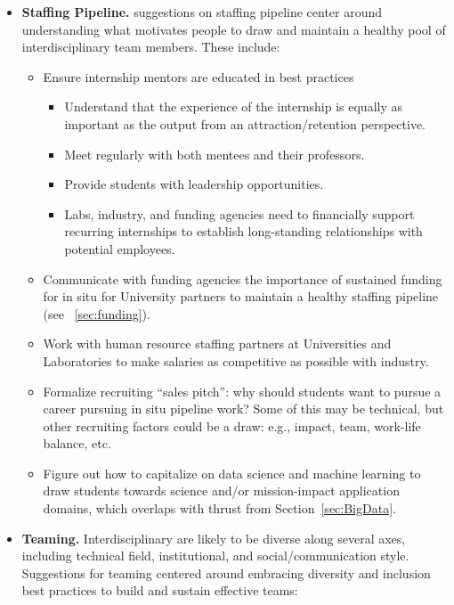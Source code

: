 \begin{itemize}
    \item \textbf{\sffamily Staffing Pipeline.} suggestions on staffing pipeline center around understanding what motivates people to draw and maintain a healthy pool of interdisciplinary team members.  These include:
    \begin{itemize}
        \item Ensure internship mentors are educated in best practices  
        \begin{itemize}
            \item Understand that the experience of the internship is equally as important as the output from an attraction/retention perspective.
            \item  Meet regularly with both mentees and their professors.
            \item  Provide students with leadership opportunities.
            \item  Labs, industry, and funding agencies need to financially support recurring internships to establish long-standing relationships with potential employees.
        \end{itemize}
        \item Communicate with funding agencies the importance of sustained funding for in situ for University partners to maintain a healthy staffing pipeline (see ~\ref{sec:funding}).
        \item Work with human resource staffing partners at Universities and Laboratories to make salaries as competitive as possible with industry.
        \item Formalize recruiting ``sales pitch'': why should students want to pursue a career pursuing in situ pipeline work? Some of this may be technical, but other recruiting factors could be a draw: e.g., impact, team, work-life balance, etc.
        \item Figure out how to capitalize on data science and machine learning to draw students towards science and/or mission-impact application domains, which overlaps with thrust from Section~\ref{sec:BigData}.
    \end{itemize}
    \item \textbf{\sffamily Teaming.} Interdisciplinary are likely to be diverse along several axes, including technical field, institutional, and social/communication style.  Suggestions for teaming centered around embracing diversity and inclusion best practices to build and sustain effective teams:
\begin{itemize}

\end{itemize}
\end{itemize}
